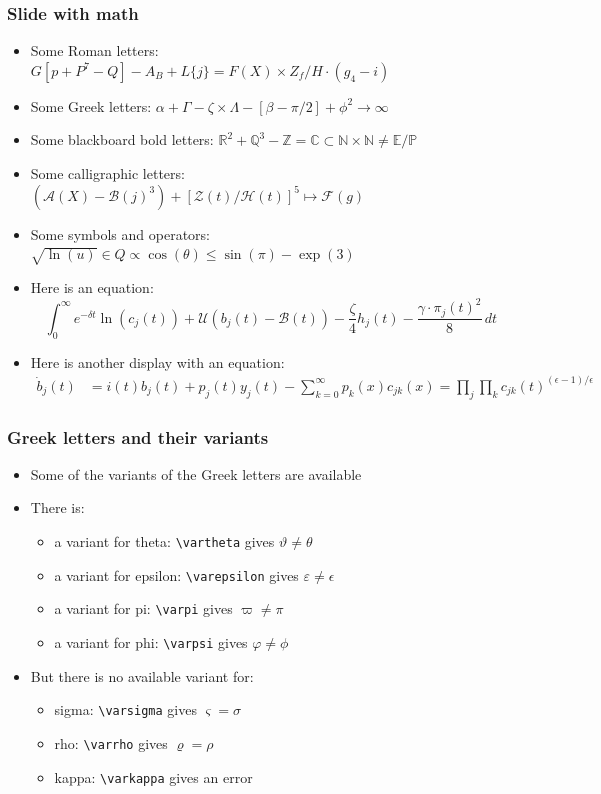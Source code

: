 \begin{frame}
\frametitle{Slide with math}
\begin{itemize}
\item Some Roman letters: $G[p + P^7-Q] - A_B + L\{j\} = F(X) \times Z_f/H \cdot (g_4 - i)$
\item Some Greek letters: $\alpha + \Gamma - \zeta \times \Lambda - [\beta - \pi/2] + \phi^2 \to \infty$
\item Some blackboard bold letters: $\mathbb{R}^2 + \mathbb{Q}^3 - \mathbb{Z} = \mathbb{C} \subset \mathbb{N} \times \mathbb{N} \neq \mathbb{E} / \mathbb{P}$
\item Some calligraphic letters: $(\mathcal{A}(X) - \mathcal{B}(j)^3) + [\mathcal{Z}(t) / \mathcal{H}(t)]^5 \mapsto \mathcal{F}(g) $
\item Some symbols and operators: $\sqrt{\ln(u)} \in Q \propto \cos(\theta) \leq \sin(\pi) - \exp(3)$
\item Here is an equation:
\begin{equation*}
\int_{0}^{\infty}e^{-\delta t} \ln(c_{j}(t))+ \mathcal{U}(b_{j}(t) - \mathcal{B}(t))- \frac{\zeta}{4} h_{j}(t) -\frac{\gamma \cdot \pi_{j}(t)^2}{8}\,dt
\end{equation*}
\item Here is another display with an equation:
\begin{align*}
\dot{b}_{j}(t) &= i(t) b_{j}(t) + p_{j}(t)  y_{j}(t) - \sum_{k=0}^{\infty} p_{k}(x) c_{jk}(x) = \prod_{j} \prod_{k} c_{jk}(t)^{(\epsilon-1)/\epsilon} 
\end{align*}
\end{itemize}
\end{frame}

\begin{frame}
\frametitle{Greek letters and their variants}
\begin{itemize}
\item Some  of the variants of the Greek letters are available
\item There is:
\begin{itemize}
\item a variant for theta: \texttt{\textbackslash vartheta} gives $\vartheta \neq \theta$
\item a variant for epsilon: \texttt{\textbackslash varepsilon} gives $\varepsilon \neq \epsilon$
\item a variant for pi: \texttt{\textbackslash varpi} gives $\varpi \neq \pi$
\item a variant for phi: \texttt{\textbackslash varpsi} gives $\varphi \neq \phi$
\end{itemize}
\item But there is no available variant for:
\begin{itemize}
\item sigma: \texttt{\textbackslash varsigma} gives $\varsigma = \sigma$
\item rho: \texttt{\textbackslash varrho} gives $\varrho = \rho$
\item kappa: \texttt{\textbackslash varkappa} gives an error
\end{itemize}
 \end{itemize}	
\end{frame}

